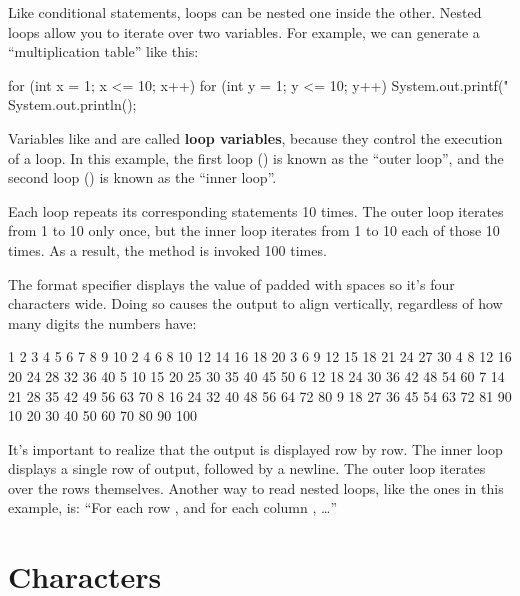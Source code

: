 
Like conditional statements, loops can be nested one inside the other.
Nested loops allow you to iterate over two variables.
For example, we can generate a ``multiplication table'' like this:

\begin{code}
for (int x = 1; x <= 10; x++) {
    for (int y = 1; y <= 10; y++) {
        System.out.printf("%
    }
    System.out.println();
}
\end{code}


Variables like  and  are called {\bf loop variables}, because they control the execution of a loop.
In this example, the first loop () is known as the ``outer loop'', and the second loop () is known as the ``inner loop''.

Each loop repeats its corresponding statements 10 times.
The outer loop iterates from 1 to 10 only once, but the inner loop iterates from 1 to 10 each of those 10 times.
As a result, the  method is invoked 100 times.


The format specifier  displays the value of  padded with spaces so it's four characters wide.
Doing so causes the output to align vertically, regardless of how many digits the numbers have:

\begin{stdout}
   1   2   3   4   5   6   7   8   9  10
   2   4   6   8  10  12  14  16  18  20
   3   6   9  12  15  18  21  24  27  30
   4   8  12  16  20  24  28  32  36  40
   5  10  15  20  25  30  35  40  45  50
   6  12  18  24  30  36  42  48  54  60
   7  14  21  28  35  42  49  56  63  70
   8  16  24  32  40  48  56  64  72  80
   9  18  27  36  45  54  63  72  81  90
  10  20  30  40  50  60  70  80  90 100
\end{stdout}

It's important to realize that the output is displayed row by row.
The inner loop displays a single row of output, followed by a newline.
The outer loop iterates over the rows themselves.
Another way to read nested loops, like the ones in this example, is: ``For each row , and for each column , \ldots''


\section{Characters}

